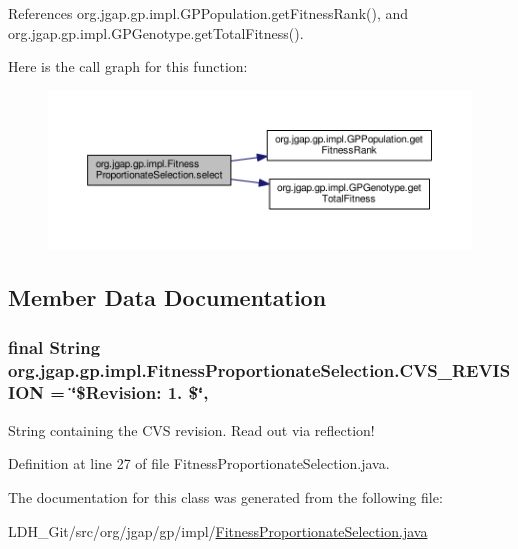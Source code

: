 References org.\-jgap.\-gp.\-impl.\-G\-P\-Population.\-get\-Fitness\-Rank(), and org.\-jgap.\-gp.\-impl.\-G\-P\-Genotype.\-get\-Total\-Fitness().



Here is the call graph for this function\-:
\nopagebreak
\begin{figure}[H]
\begin{center}
\leavevmode
\includegraphics[width=350pt]{classorg_1_1jgap_1_1gp_1_1impl_1_1_fitness_proportionate_selection_a1bba66dc3595d954f39bd4121bc1fa7f_cgraph}
\end{center}
\end{figure}




\subsection{Member Data Documentation}
\hypertarget{classorg_1_1jgap_1_1gp_1_1impl_1_1_fitness_proportionate_selection_a388157e7a6ba1be832e68efb5c4f5b09}{
\subsubsection[{C\-V\-S\-\_\-\-R\-E\-V\-I\-S\-I\-O\-N}]{\setlength{\rightskip}{0pt plus 5cm}final String org.\-jgap.\-gp.\-impl.\-Fitness\-Proportionate\-Selection.\-C\-V\-S\-\_\-\-R\-E\-V\-I\-S\-I\-O\-N = \char`\"{}\$Revision\-: 1. \$\char`\"{}\hspace{0.3cm}{\ttfamily [static]}, {\ttfamily [private]}}}\label{classorg_1_1jgap_1_1gp_1_1impl_1_1_fitness_proportionate_selection_a388157e7a6ba1be832e68efb5c4f5b09}
String containing the C\-V\-S revision. Read out via reflection! 

Definition at line 27 of file Fitness\-Proportionate\-Selection.\-java.



The documentation for this class was generated from the following file\-:\begin{DoxyCompactItemize}
\item 
L\-D\-H\-\_\-\-Git/src/org/jgap/gp/impl/\hyperlink{_fitness_proportionate_selection_8java}{Fitness\-Proportionate\-Selection.\-java}\end{DoxyCompactItemize}
